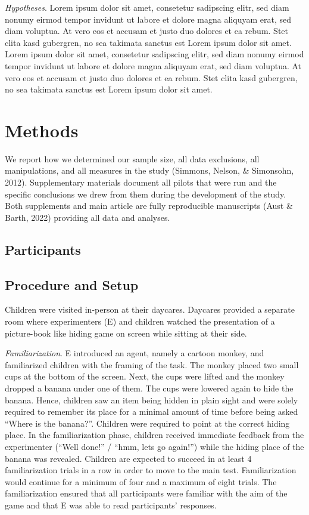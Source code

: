 \documentclass[
  man]{apa6}
\begin{document}
\emph{Hypotheses}. Lorem ipsum dolor sit amet, consetetur sadipscing elitr, sed diam nonumy eirmod tempor invidunt ut labore et dolore magna aliquyam erat, sed diam voluptua. At vero eos et accusam et justo duo dolores et ea rebum. Stet clita kasd gubergren, no sea takimata sanctus est Lorem ipsum dolor sit amet. Lorem ipsum dolor sit amet, consetetur sadipscing elitr, sed diam nonumy eirmod tempor invidunt ut labore et dolore magna aliquyam erat, sed diam voluptua. At vero eos et accusam et justo duo dolores et ea rebum. Stet clita kasd gubergren, no sea takimata sanctus est Lorem ipsum dolor sit amet.

\section{Methods}\label{methods}

We report how we determined our sample size, all data exclusions, all manipulations, and all measures in the study (Simmons, Nelson, \& Simonsohn, 2012). Supplementary materials document all pilots that were run and the specific conclusions we drew from them during the development of the study. Both supplements and main article are fully reproducible manuscripts (Aust \& Barth, 2022) providing all data and analyses.

\subsection{Participants}\label{participants}

\subsection{Procedure and Setup}\label{procedure-and-setup}

Children were visited in-person at their daycares. Daycares provided a separate room where experimenters (E) and children watched the presentation of a picture-book like hiding game on screen while sitting at their side.

\emph{Familiarization}. E introduced an agent, namely a cartoon monkey, and familiarized children with the framing of the task. The monkey placed two small cups at the bottom of the screen. Next, the cups were lifted and the monkey dropped a banana under one of them. The cups were lowered again to hide the banana. Hence, children saw an item being hidden in plain sight and were solely required to remember its place for a minimal amount of time before being asked ``Where is the banana?''. Children were required to point at the correct hiding place. In the familiarization phase, children received immediate feedback from the experimenter (``Well done!'' / ``hmm, lets go again!'') while the hiding place of the banana was revealed. Children are expected to succeed in at least 4 familiarization trials in a row in order to move to the main test. Familiarization would continue for a minimum of four and a maximum of eight trials. The familiarization ensured that all participants were familiar with the aim of the game and that E was able to read participants' responses.
\end{document}

